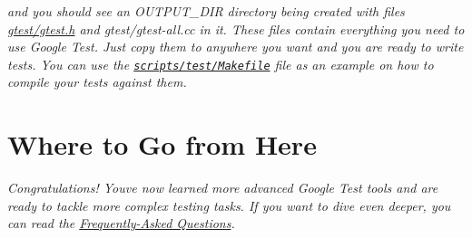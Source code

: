 {\itshape and you should see an {\ttfamily O\+U\+T\+P\+U\+T\+\_\+\+D\+IR} directory being created with files {\ttfamily \hyperlink{gtest_8h}{gtest/gtest.\+h}} and {\ttfamily gtest/gtest-\/all.\+cc} in it. These files contain everything you need to use Google Test. Just copy them to anywhere you want and you are ready to write tests. You can use the \href{../scripts/test/Makefile}{\tt scripts/test/\+Makefile} file as an example on how to compile your tests against them.}

{\itshape \section*{Where to Go from Here}}

{\itshape }

{\itshape Congratulations! You\textquotesingle{}ve now learned more advanced Google Test tools and are ready to tackle more complex testing tasks. If you want to dive even deeper, you can read the \hyperlink{_v1__7___f_a_q_8md}{Frequently-\/\+Asked Questions}. }